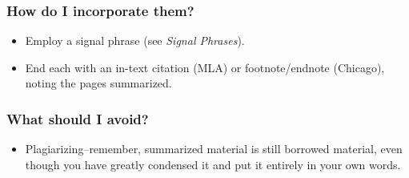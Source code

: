 \subsubsection{How do I incorporate them?}

\begin{itemize}
\item Employ a signal phrase (see \emph{Signal Phrases}).

\item End each with an in-text citation (MLA) or footnote/endnote (Chicago), noting the pages summarized.
\end{itemize}

\subsubsection{What should I avoid?}
\begin{itemize}

\item Plagiarizing--remember, summarized material is still borrowed material, even though you have greatly condensed it and put it entirely in your own words.
 \end{itemize}

